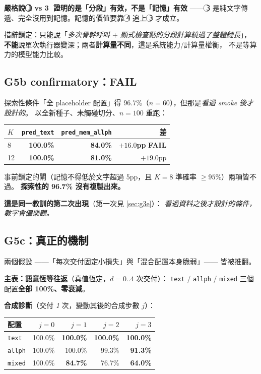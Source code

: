 \documentclass[11pt, a4paper]{article}
\newcommand{\FAIL}{\textcolor{red!70!black}{\textbf{FAIL}}}
\begin{document}
\textbf{嚴格說 \textcircled{1} vs \textcircled{3} 證明的是「分段」有效，不是「記憶」有效} ——
\textcircled{3} 是純文字傳遞、完全沒用到記憶。記憶的價值要靠 \textcircled{4} 追上 \textcircled{3} 才成立。

措辭鎖定：只能說「\emph{多次骨幹呼叫 $+$ 顯式檢查點的分段計算繞過了整體鏈長}」，
\textbf{不能}說單次執行器變深；兩者\textbf{計算量不同}，這是系統能力/計算量權衡，
不是等算力的模型能力比較。

\subsection{G5b confirmatory：\FAIL{}}

探索性條件「全 placeholder 配置」得 96.7\%（$n{=}60$），但那是\emph{看過 smoke 後才設計的}。
以全新種子、未觸碰切分、$n{=}100$ 重跑：

\begin{table}[h]
\centering
\small
\begin{tabular}{lrrr}
\toprule
$K$ & \verb|pred_text| & \verb|pred_mem_allph| & 差 \\
\midrule
8 & \textbf{100.0\%} & \textbf{84.0\%} & \textbf{$+16.0$pp} \FAIL{} \\
12 & \textbf{100.0\%} & \textbf{81.0\%} & $+19.0$pp \\
\bottomrule
\end{tabular}
\end{table}

事前鎖定的閘（記憶不得低於文字超過 5pp，且 $K{=}8$ 準確率 $\geq 95\%$）兩項皆不過。
\textbf{探索性的 96.7\% 沒有複製出來。}

\textbf{這是同一教訓的第二次出現}（第一次見 \autoref{sec:g3e}）：
\emph{看過資料之後才設計的條件，數字會偏樂觀。}

\subsection{G5c：真正的機制}

兩個假設 ——「每次交付固定小損失」與「混合配置本身脆弱」—— 皆被推翻。

\textbf{主表：語意恆等往返}（真值恆定，$d = 0..4$ 次交付）：
\verb|text| / \verb|allph| / \verb|mixed| 三個配置\textbf{全部 100\%、零衰減}。

\textbf{合成診斷}（交付 \emph{1} 次，變動其後的合成步數 $j$）：

\begin{table}[h]
\centering
\small
\begin{tabular}{lrrrr}
\toprule
配置 & $j{=}0$ & $j{=}1$ & $j{=}2$ & $j{=}3$ \\
\midrule
\verb|text| & 100.0\% & \textbf{100.0\%} & \textbf{100.0\%} & \textbf{100.0\%} \\
\verb|allph| & 100.0\% & 100.0\% & 99.3\% & \textbf{91.3\%} \\
\verb|mixed| & 100.0\% & \textbf{84.7\%} & 76.7\% & \textbf{64.0\%} \\
\bottomrule
\end{tabular}
\end{table}
\end{document}
